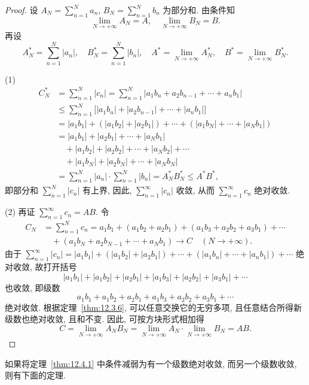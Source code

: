 \begin{proof}
设 $A_{N}=\sum_{n=1}^{N}a_{n}$, $B_{N}=\sum_{n=1}^{N}b_{n}$ 为部分和. 由条件知
\[
  \lim_{N\to+\infty}A_{N}=A,\quad\lim_{N\to+\infty}B_{N}=B.
\]
再设
\[
  A_{N}^{*}=\sum_{n=1}^{N}|a_{n}|,\quad B_{N}^{*}=\sum_{n=1}^{N}|b_{n}|,\quad A^{*}=\lim_{N\to+\infty}A_{N}^{*},\quad B^{*}=\lim_{N\to+\infty}B_{N}^{*}.
\]

(1)
\[
  \begin{aligned}
    C_{N}^{*}&=\sum_{n=1}^{N}|c_{n}|=\sum_{n=1}^{N}\left|a_{1}b_{n}+a_{2}b_{n-1}+\cdots+a_{n}b_{1}\right|\\
    &\leqslant\sum_{n=1}^{N}\bigl[|a_{1}b_{n}|+|a_{2}b_{n-1}|+\cdots+|a_{n}b_{1}|\bigr]\\
    &=|a_{1}b_{1}|+(|a_{1}b_{2}|+|a_{2}b_{1}|)+\cdots+(|a_{1}b_{N}|+\cdots+|a_{N}b_{1}|)\\
    &=|a_{1}b_{1}|+|a_{2}b_{1}|+\cdots+|a_{N}b_{1}|\\
    &\quad+|a_{1}b_{2}|+|a_{2}b_{2}|+\cdots+|a_{N}b_{2}|+\cdots\\
    &\quad+|a_{1}b_{N}|+|a_{2}b_{N}|+\cdots+|a_{N}b_{N}|\\
    &=\sum_{n=1}^{N}|a_{n}|\cdot\sum_{n=1}^{N}|b_{n}|=A_{N}^{*}B_{N}^{*}\leqslant A^{*}B^{*},
  \end{aligned}
\]
即部分和 $\sum_{n=1}^{N}|c_{n}|$ 有上界, 因此, $\sum_{n=1}^{\infty}|c_{n}|$ 收敛, 从而 $\sum_{n=1}^{\infty}c_{n}$ 绝对收敛.

(2) 再证 $\sum_{n=1}^{\infty}c_{n}=AB$. 令
\[
  \begin{aligned}
    C_{N}&=\sum_{n=1}^{N}c_{n}=a_{1}b_{1}+(a_{1}b_{2}+a_{2}b_{1})+(a_{1}b_{3}+a_{2}b_{2}+a_{3}b_{1})+\cdots\\
    &\quad+(a_{1}b_{N}+a_{2}b_{N-1}+\cdots+a_{N}b_{1})\to C\quad(N\to+\infty).
  \end{aligned}
\]
由于 $\sum_{n=1}^{\infty}|c_{n}|=|a_{1}b_{1}|+(|a_{1}b_{2}|+|a_{2}b_{1}|)+\cdots+(|a_{1}b_{n}|+\cdots+|a_{n}b_{1}|)+\cdots$ 绝对收敛, 故打开括号
\[
  |a_{1}b_{1}|+|a_{1}b_{2}|+|a_{2}b_{1}|+|a_{1}b_{3}|+|a_{2}b_{2}|+|a_{3}b_{1}|+\cdots
\]
也收敛, 即级数
\[
  a_{1}b_{1}+a_{1}b_{2}+a_{2}b_{1}+a_{1}b_{3}+a_{2}b_{2}+a_{3}b_{1}+\cdots
\]
绝对收敛. 根据定理~\ref{thm:12.3.6}, 可以任意交换它的无穷多项, 且任意结合所得新级数也绝对收敛, 且和不变. 因此, 可按方块形式相加得
\[
  C=\lim_{N\to+\infty}A_{N}B_{N}=\lim_{N\to+\infty}A_{N}\cdot\lim_{N\to+\infty}B_{N}=AB.
\]
\end{proof}

如果将定理~\ref{thm:12.4.1} 中条件减弱为有一个级数绝对收敛, 而另一个级数收敛, 则有下面的定理.

